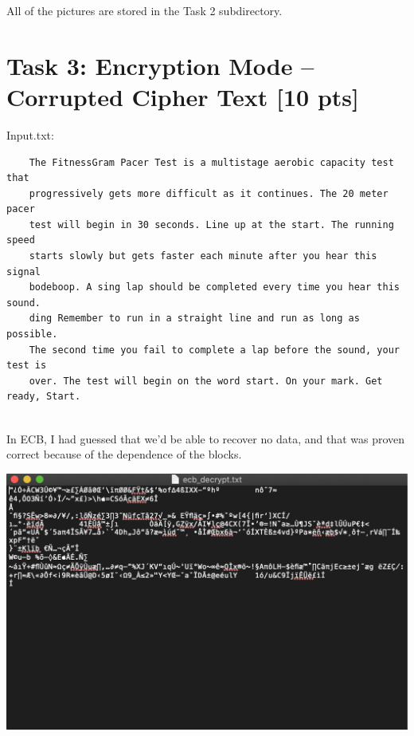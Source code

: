 \documentclass{article}
\begin{document}
All of the pictures are stored in the Task 2 subdirectory.

\section{Task 3: Encryption Mode – Corrupted Cipher Text [10 pts]}
Input.txt:
\begin{verbatim}
    The FitnessGram Pacer Test is a multistage aerobic capacity test that 
    progressively gets more difficult as it continues. The 20 meter pacer 
    test will begin in 30 seconds. Line up at the start. The running speed 
    starts slowly but gets faster each minute after you hear this signal 
    bodeboop. A sing lap should be completed every time you hear this sound. 
    ding Remember to run in a straight line and run as long as possible. 
    The second time you fail to complete a lap before the sound, your test is
    over. The test will begin on the word start. On your mark. Get ready, Start.
\end{verbatim}\\

In ECB, I had guessed that we'd be able to recover no data, and that was proven correct because of the dependence of the blocks.\\
\begin{center}
    \includegraphics[scale=0.5]{ecb_decrypt.png}
\end{center}
\end{document}
